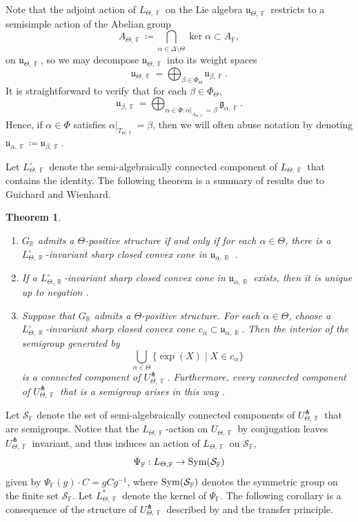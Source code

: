 \documentclass{amsart}
\theoremstyle{plain}
\newtheorem{theorem}[proposition]{Theorem}
\theoremstyle{definition}
\DeclareMathOperator{\Fb}{{\mathbb{F}}}
\DeclareMathOperator{\Rb}{{\mathbb{R}}}
\newcommand{\1}{\mathbf{1}}
\begin{document}
Note that the adjoint action of $L_{\Theta,\Fb}$ on the Lie algebra $\mathfrak u_{\Theta,\Fb}$ restricts to a semisimple action of the Abelian group  
\[
A_{\Theta,\Fb}\coloneqq\bigcap_{\alpha\in\Delta\setminus\Theta}\ker\alpha\subset A_{\Fb},
\] 
on $\mathfrak u_{\Theta,\Fb}$, so we may decompose $\mathfrak u_{\Theta,\Fb}$ into its weight spaces
\[\mathfrak u_{\Theta,\Fb}=\bigoplus_{\beta\in \Phi_{\Theta}}\mathfrak u_{\beta,\Fb}.\]
It is straightforward to verify that for each $\beta\in\Phi_\Theta$, 
\[\mathfrak u_{\beta,\Fb}=\bigoplus_{\alpha\in\Phi:\alpha|_{A_{\Theta,\Fb}}=\beta}\mathfrak g_{\alpha,\Fb}.\]
Hence, if $\alpha\in\Phi$ satisfies $\alpha|_{T_{\Theta,\Fb}}=\beta$, then we will often abuse notation by denoting $\mathfrak u_{\alpha,\Fb}\coloneqq\mathfrak u_{\beta,\Fb}$. 



Let $L_{\Theta,\Fb}^\circ$ denote the semi-algebraically connected component of $L_{\Theta,\Fb}$ that contains the identity. The following theorem is a summary of results due to Guichard and Wienhard.

\begin{theorem}{\ }\label{theorem: GWU}
\begin{enumerate}
\item $G_{\Rb}$ admits a $\Theta$-positive structure if and only if for each $\alpha\in\Theta$, there is a $L_{\Theta,\Rb}^\circ$-invariant sharp closed convex cone in $\mathfrak u_{\alpha,\Rb}$ \cite[Definition 3.1, Theorem 12.2]{guichard2025generalizing}.
\item If a $L_{\Theta,\Rb}^\circ$-invariant sharp closed convex cone in $\mathfrak u_{\alpha,\Rb}$ exists, then it is unique up to negation \cite[Remark 3.2, Proposition 3.6]{guichard2025generalizing}. 
\item Suppose that $G_{\Rb}$ admits a $\Theta$-positive structure. For each $\alpha\in\Theta$, choose a $L_{\Theta,\Rb}^\circ$-invariant sharp closed convex cone $c_\alpha\subset\mathfrak u_{\alpha,\Rb}$. Then the interior of the semigroup generated by 
\[\bigcup_{\alpha\in\Theta}\{\exp(X)\mid X\in c_\alpha\}\]
is a connected component of $U_{\Theta,\Fb}^\pitchfork$. Furthermore, every connected component of $U_{\Theta,\Fb}^\pitchfork$ that is a semigroup arises in this way \cite[Theorem 12.2]{guichard2025generalizing}.
\end{enumerate}
\end{theorem}

Let $\mathcal S_{\Fb}$ denote the set of semi-algebraically connected components of $U_{\Theta,\Fb}^\pitchfork$ that are semigroups. Notice that the $L_{\Theta,\Fb}$-action on $U_{\Theta,\Fb}$ by conjugation leaves $U_{\Theta,\Fb}^\pitchfork$ invariant, and thus induces an action of $L_{\Theta,\Fb}$ on $\mathcal S_{\Fb}$,
\[\Psi_{\Fb}:L_{\Theta,\Fb}\to {\rm Sym}(\mathcal S_{\Fb})\]
given by $\Psi_{\Fb}(g)\cdot C=gCg^{-1}$, where ${\rm Sym}(\mathcal S_{\Fb})$ denotes the symmetric group on the finite set $\mathcal S_{\Fb}$. Let $L_{\Theta,\Fb}^*$ denote the kernel of $\Psi_{\Fb}$. The following corollary is a consequence of the structure of $U_{\Theta,\Fb}^\pitchfork$ described by  and the transfer principle.
\end{document}
